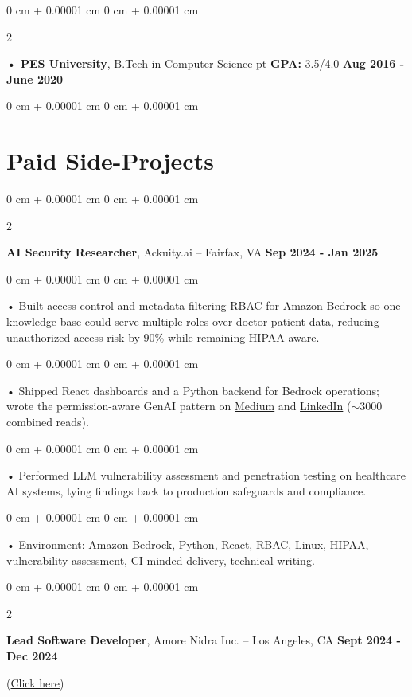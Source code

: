 \documentclass[10pt, letterpaper]{article}
\newenvironment{onecolentry}{
    \begin{adjustwidth}{
        0 cm + 0.00001 cm
    }{
        0 cm + 0.00001 cm
    }
}{
    \end{adjustwidth}
} %
\newenvironment{twocolentry}[2][]{
    \onecolentry
    \def\secondColumn{#2}
    \setcolumnwidth{\fill, 4.5 cm}
    \begin{paracol}{2}
}{
    \switchcolumn \raggedleft \secondColumn
    \end{paracol}
    \endonecolentry
} %
\begin{document}
        \begin{twocolentry}{
            \textbf{Aug 2016 - June 2020}
        }
            \textbf{ • PES University}, B.Tech in Computer Science  pt \textbf{GPA:} 3.5/4.0  \end{twocolentry}
        \begin{onecolentry}

                        \vspace{0.4cm}
    \section{Paid Side-Projects}
            \vspace{2 pt }
                    \begin{twocolentry}{
            \textbf{Sep 2024 - Jan 2025}
        }
            \textbf{AI Security Researcher}, Ackuity.ai -- Fairfax, VA\end{twocolentry}

        \begin{onecolentry}
             • Built access-control and metadata-filtering RBAC for Amazon Bedrock so one knowledge base could serve multiple roles over doctor-patient data, reducing unauthorized-access risk by 90\% while remaining HIPAA-aware.
        \end{onecolentry}
        \begin{onecolentry}
             • Shipped React dashboards and a Python backend for Bedrock operations; wrote the permission-aware GenAI pattern on \href{https://medium.com/@sreenikethaathreya/building-a-permission-aware-genai-application-on-amazon-bedrock-8fdc2410dd43}{Medium} and \href{https://www.linkedin.com/pulse/building-permission-aware-genai-application-amazon-bedrock-aathreya-g7nme/}{LinkedIn} ($\sim$3000 combined reads).
        \end{onecolentry}
        \begin{onecolentry}
             • Performed LLM vulnerability assessment and penetration testing on healthcare AI systems, tying findings back to production safeguards and compliance.
        \end{onecolentry}
        \begin{onecolentry}
             • Environment: Amazon Bedrock, Python, React, RBAC, Linux, HIPAA, vulnerability assessment, CI-minded delivery, technical writing.

        \end{onecolentry}
                \vspace{0.4cm}
        \begin{twocolentry}{
            \textbf{Sept 2024 - Dec 2024}
        }
            \textbf{Lead Software Developer}, Amore Nidra Inc. -- Los Angeles, CA\end{twocolentry}(\href{https://amorenidra.com}{Click here})


\end{onecolentry}
\end{document}
